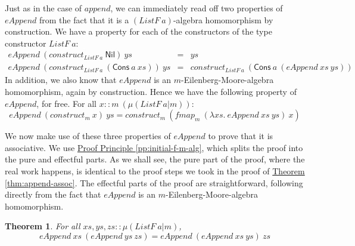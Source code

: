 \documentclass{jfp1}
\newtheorem{theorem}{Theorem}
\newcommand{\proofprinref}[1]{\hyperref[#1]{Proof Principle \ref*{#1}}}
\newcommand{\thmref}[1]{\hyperref[#1]{Theorem \ref*{#1}}}
\begin{document}
Just as in the case of $\mathit{append}$, we can immediately read off
two properties of $\mathit{eAppend}$ from the fact that it is a
$(\mathit{ListF}~a)$-algebra homomorphism by construction. We have a
property for each of the constructors of the type constructor
$\mathit{ListF}~a$:
\begin{displaymath}
  \begin{array}{rcl}
    \mathit{eAppend}~(\mathit{construct}_{\mathit{ListF}~a}~\mathsf{Nil})~\mathit{ys} & = & \mathit{ys} \\
    \mathit{eAppend}~(\mathit{construct}_{\mathit{ListF}~a}~(\mathsf{Cons}~a~\mathit{xs}))~\mathit{ys} & = & \mathit{construct}_{\mathit{ListF}~a}~(\mathsf{Cons}~a~(\mathit{eAppend}~\mathit{xs}~\mathit{ys}))
  \end{array}
\end{displaymath}
In addition, we also know that $\mathit{eAppend}$ is an
$m$-Eilenberg-Moore-algebra homomorphism, again by construction. Hence
we have the following property of $\mathit{eAppend}$, for free. For
all $x :: m~(\mu(\mathit{ListF}~a|m))$:
\begin{displaymath}
  \mathit{eAppend}~(\mathit{construct}_m~\mathit{x})~\mathit{ys} = \mathit{construct}_m~(\mathit{fmap}_m~(\lambda \mathit{xs}.~\mathit{eAppend}~\mathit{xs}~\mathit{ys})~\mathit{x})
\end{displaymath}

We now make use of these three properties of $\mathit{eAppend}$ to
prove that it is associative. We use
\proofprinref{pp:initial-f-m-alg}, which splits the proof into the
pure and effectful parts. As we shall see, the pure part of the proof,
where the real work happens, is identical to the proof steps we took
in the proof of \thmref{thm:append-assoc}. The effectful parts of
the proof are straightforward, following directly from the fact that
$\mathit{eAppend}$ is an $m$-Eilenberg-Moore-algebra homomorphism.

\begin{theorem}
  For all $\mathit{xs}, \mathit{ys}, \mathit{zs} :: \mu(\mathit{ListF}~a|m)$,
  \begin{displaymath}
    \mathit{eAppend}~\mathit{xs}~(\mathit{eAppend}~\mathit{ys}~\mathit{zs}) = \mathit{eAppend}~(\mathit{eAppend}~\mathit{xs}~\mathit{ys})~\mathit{zs}
  \end{displaymath}
\end{theorem}
\end{document}
